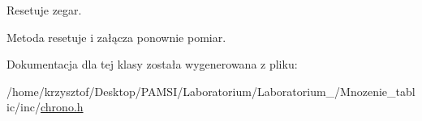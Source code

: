 \-Resetuje zegar. 

\-Metoda resetuje i załącza ponownie pomiar. 

\-Dokumentacja dla tej klasy została wygenerowana z pliku\-:\begin{DoxyCompactItemize}
\item 
/home/krzysztof/\-Desktop/\-P\-A\-M\-S\-I/\-Laboratorium/\-Laboratorium\-\_/\-Mnozenie\-\_\-tablic/inc/\hyperlink{chrono_8h}{chrono.\-h}\end{DoxyCompactItemize}
